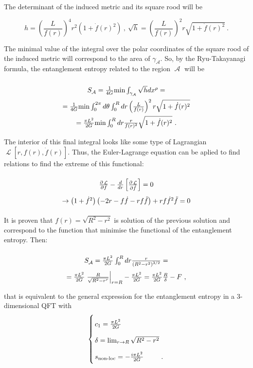 \documentclass[lettersize,journal]{IEEEtran}
\providecommand{\eq}[2]{
    \begin{equation}
        #2
    \label{eq:#1}
    \end{equation}
}
\DeclareMathOperator{\calA}{\mathcal{A}}
\DeclareMathOperator{\calL}{\mathcal{L}}
\begin{document}
The determinant of the induced metric and its square rood will be
\eq{1h}{
    h = \left( \frac{L}{f(r)} \right) ^4 r^2 ( 1 + \dot{f}(r)^2 ) \ , \
    \sqrt{h} = \left( \frac{L}{f(r)} \right) ^2 r \sqrt{ 1 + \dot{f}(r)^2 } \ .
}

The minimal value of the integral over the polar coordinates of the square rood of the induced metric will correspond to the area of $\gamma_{\calA}$. So, by the Ryu-Takayanagi formula, the entanglement entropy related to the region $\calA$ will be
\eq{1EEA}{
    \arraycolsep=1.4pt\def\arraystretch{2}
    \begin{array}{c}
        S_{\calA} = \frac{1}{4G} \text{min} \int_{\gamma_{\calA}} \sqrt{h} dx^\rho = \\
        = \frac{1}{4G} \text{min} \int_0^{2\pi} d\theta \int_0^R dr \left( \frac{L}{f(r)} \right) ^2 r \sqrt{ 1 + \dot{f}(r)^2 } \\
        = \frac{\pi L^2}{2G} \text{min} \int_0^R dr \frac{r}{f(r)^2} \sqrt{ 1 + \dot{f}(r)^2 } \ .
    \end{array}
}

The interior of this final integral looks like some type of Lagrangian $\calL [r,f(r),\dot{f}(r)]$. Thus, the Euler-Lagrange equation can be aplied to find relations to find the extreme of this functional:
\eq{1EL}{
    \arraycolsep=1.4pt\def\arraystretch{2}
    \begin{array}{c}
        \frac{\partial \calL}{\partial f} - \frac{d}{dr} \left[ \frac{\partial \calL}{\partial \dot{f}} \right] = 0 \\
        \rightarrow \left( 1+\dot{f}^2 \right) \left( -2r-f\dot{f}-rf\ddot{f} \right) + rf\dot{f}^2\ddot{f} = 0
    \end{array}
}

It is proven that $f(r) = \sqrt{R^2 - r^2}$ is solution of the previous solution and correspond to the function that minimise the functional of the entanglement entropy. Then:
\eq{1sol}{
    \arraycolsep=1.4pt\def\arraystretch{2}
    \begin{array}{c}
    S_{\calA} = \frac{\pi L^2}{2G} \int_0^R dr \frac{r}{\left(R^2-r^2\right)^{3/2}} = \\
    = \frac{\pi L^2}{2G} \left. \frac{R}{\sqrt{R^2-r^r}} \right|_{r=R} - \frac{\pi L^2}{2G} = \frac{\pi L^2}{2G} \frac{R}{\delta} - F \ ,
    \end{array}
}
that is equivalent to the general expression for the entanglement entropy in a 3-dimensional QFT with
\[
    \left\{
    \arraycolsep=1.4pt\def\arraystretch{2}
    \begin{array}{lr}
        c_1 = \frac{\pi L^2}{2G} \\
        \delta = \lim_{r \to R} \sqrt{R^2-r^2} \\
        s_{\text{non-loc}} = - \frac{i \pi L^2}{2G} & .
    \end{array}
    \right.
\]






\printbibliography
\end{document}
